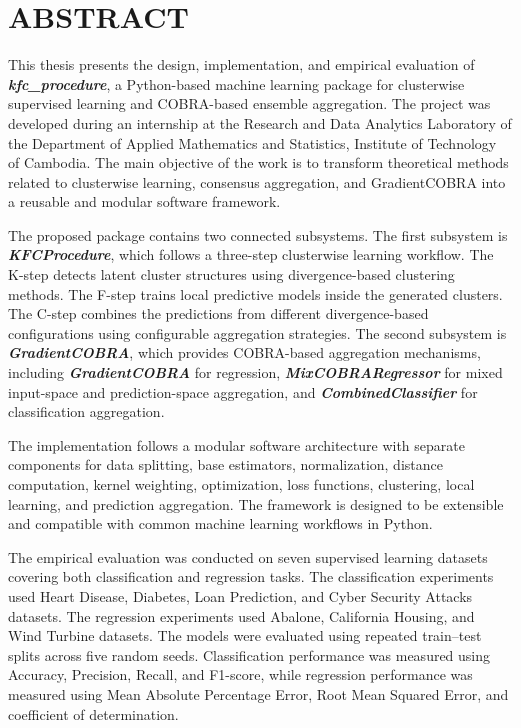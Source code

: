 \clearpage
{}
\chapter*{ABSTRACT}


\hs This thesis presents the design, implementation, and empirical evaluation of \textbf{\textit{kfc\_procedure}}, a Python-based machine learning package for clusterwise supervised learning and COBRA-based ensemble aggregation. The project was developed during an internship at the Research and Data Analytics Laboratory of the Department of Applied Mathematics and Statistics, Institute of Technology of Cambodia. The main objective of the work is to transform theoretical methods related to clusterwise learning, consensus aggregation, and GradientCOBRA into a reusable and modular software framework.

The proposed package contains two connected subsystems. The first subsystem is \textbf{\textit{KFCProcedure}}, which follows a three-step clusterwise learning workflow. The K-step detects latent cluster structures using divergence-based clustering methods. The F-step trains local predictive models inside the generated clusters. The C-step combines the predictions from different divergence-based configurations using configurable aggregation strategies. The second subsystem is \textbf{\textit{GradientCOBRA}}, which provides COBRA-based aggregation mechanisms, including \textbf{\textit{GradientCOBRA}} for regression, \textbf{\textit{MixCOBRARegressor}} for mixed input-space and prediction-space aggregation, and \textbf{\textit{CombinedClassifier}} for classification aggregation.

The implementation follows a modular software architecture with separate components for data splitting, base estimators, normalization, distance computation, kernel weighting, optimization, loss functions, clustering, local learning, and prediction aggregation. The framework is designed to be extensible and compatible with common machine learning workflows in Python.

The empirical evaluation was conducted on seven supervised learning datasets covering both classification and regression tasks. The classification experiments used Heart Disease, Diabetes, Loan Prediction, and Cyber Security Attacks datasets. The regression experiments used Abalone, California Housing, and Wind Turbine datasets. The models were evaluated using repeated train--test splits across five random seeds. Classification performance was measured using Accuracy, Precision, Recall, and F1-score, while regression performance was measured using Mean Absolute Percentage Error, Root Mean Squared Error, and coefficient of determination.

